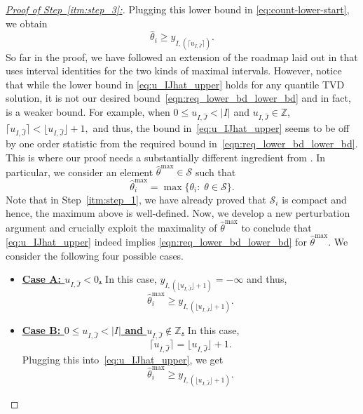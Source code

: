 \documentclass[11pt]{article}
\newcommand{\cS}{\mathcal{S}}
\theoremstyle{plain}
\theoremstyle{definition}
\theoremstyle{remark}
\begin{document}
\begin{proof}[\underline{Proof of Step~\ref{itm:step_3}:}]
Plugging this lower bound in \eqref{eq:count-lower-start}, we obtain
\begin{equation}\label{eq:u_IJhat_upper}
    \hat{\theta}_i\geq y_{I,(\lceil u_{I,\hat{J}}\rceil)}.
\end{equation}
So far in the proof, we have followed an extension of the roadmap laid out in \cite{chatterjee2026minmaxtrendfilteringgeneralizations} that uses interval identities for the two kinds of maximal intervals. However, notice that while the lower bound in \eqref{eq:u_IJhat_upper} holds for any quantile TVD solution, it is not our desired bound~\eqref{eqn:req_lower_bd_lower_bd} and in fact, is a weaker bound. For example, when $0\le u_{I,\hat{J}}<|I|$ and $u_{I,\hat J}\in\mathbb Z$, \(\lceil u_{I,\hat{J}}\rceil<\lfloor u_{I,\hat{J}}\rfloor+1,\)
and thus, the bound in~\eqref{eq:u_IJhat_upper} seems to be off by one order statistic from the required bound in~\eqref{eqn:req_lower_bd_lower_bd}. This is where our proof needs a substantially different ingredient from \cite{chatterjee2026minmaxtrendfilteringgeneralizations}. In particular, we consider an element $\hat{\theta}^{\max} \in \cS$ such that
\[\hat{\theta}^{\max}_i=\max\{\theta_i:\;\theta \in \cS\}.\]
Note that in Step~\ref{itm:step_1}, we have already proved that $\cS_i$ is compact and hence, the maximum above is well-defined. Now, we develop a new perturbation argument and crucially exploit the maximality of $\hat{\theta}^{\max}$ to conclude that \eqref{eq:u_IJhat_upper} indeed implies \eqref{eqn:req_lower_bd_lower_bd} for $\hat{\theta}^{\max}$.
 We consider the following four possible cases.
\begin{itemize}
\item \underline{\textbf{Case A: $u_{I,\hat{J}}<0$.}} In this case, \(y_{I,(\lfloor u_{I,\hat{J}}\rfloor+1)}=-\infty\) and thus, 
\[\hat\theta^{\max}_i\ge y_{I,(\lfloor u_{I,\hat{J}}\rfloor+1)}.\]

\item \underline{\textbf{Case B: $0\le u_{I,\hat{J}}<|I|$ and $u_{I,\hat{J}}\notin\mathbb Z$.}}
In this case,
\[
\lceil u_{I,\hat{J}}\rceil=\lfloor u_{I,\hat{J}}\rfloor+1.
\]
Plugging this into~\eqref{eq:u_IJhat_upper}, we get
\[
\hat\theta_i^{\max}\ge y_{I,(\lfloor u_{I,\hat{J}}\rfloor+1)}.
\]


\end{itemize}
\end{proof}
\end{document}
